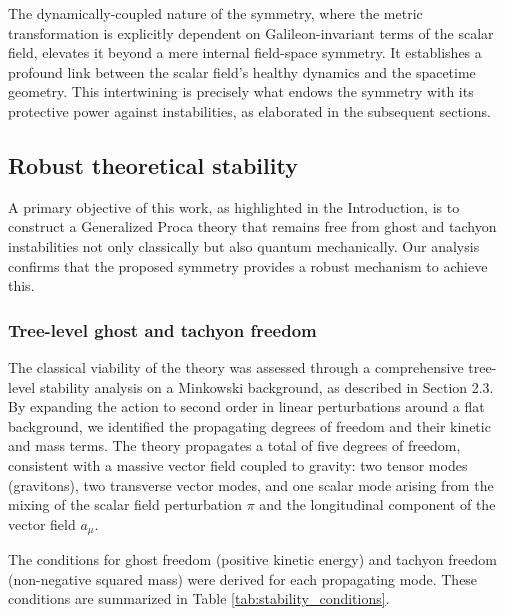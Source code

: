 \documentclass[twocolumn]{aastex631}
\begin{document}
The dynamically-coupled nature of the symmetry, where the metric transformation is explicitly dependent on Galileon-invariant terms of the scalar field, elevates it beyond a mere internal field-space symmetry. It establishes a profound link between the scalar field's healthy dynamics and the spacetime geometry. This intertwining is precisely what endows the symmetry with its protective power against instabilities, as elaborated in the subsequent sections.

\subsection{Robust theoretical stability}

A primary objective of this work, as highlighted in the Introduction, is to construct a Generalized Proca theory that remains free from ghost and tachyon instabilities not only classically but also quantum mechanically. Our analysis confirms that the proposed symmetry provides a robust mechanism to achieve this.

\subsubsection{Tree-level ghost and tachyon freedom}
The classical viability of the theory was assessed through a comprehensive tree-level stability analysis on a Minkowski background, as described in Section 2.3. By expanding the action to second order in linear perturbations around a flat background, we identified the propagating degrees of freedom and their kinetic and mass terms. The theory propagates a total of five degrees of freedom, consistent with a massive vector field coupled to gravity: two tensor modes (gravitons), two transverse vector modes, and one scalar mode arising from the mixing of the scalar field perturbation $\pi$ and the longitudinal component of the vector field $a_\mu$.

The conditions for ghost freedom (positive kinetic energy) and tachyon freedom (non-negative squared mass) were derived for each propagating mode. These conditions are summarized in Table \ref{tab:stability_conditions}.
\end{document}
